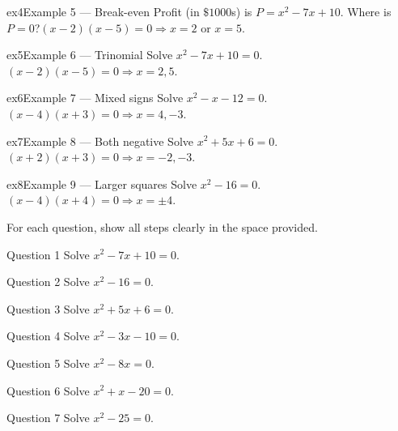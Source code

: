\documentclass[11pt]{article}
\begin{document}
\begin{example}{ex4}{Example 5 --- Break-even}
Profit (in $\$1000$s) is $P=x^2-7x+10$. Where is $P=0$?\soln $(x-2)(x-5)=0\Rightarrow x=2$ or $x=5$.
\end{example}

\begin{example}{ex5}{Example 6 --- Trinomial}
Solve $x^2-7x+10=0$.\soln $(x-2)(x-5)=0\Rightarrow x=2,5$.
\end{example}

\begin{example}{ex6}{Example 7 --- Mixed signs}
Solve $x^2-x-12=0$.\soln $(x-4)(x+3)=0\Rightarrow x=4,-3$.
\end{example}

\begin{example}{ex7}{Example 8 --- Both negative}
Solve $x^2+5x+6=0$.\soln $(x+2)(x+3)=0\Rightarrow x=-2,-3$.
\end{example}

\begin{example}{ex8}{Example 9 --- Larger squares}
Solve $x^2-16=0$.\soln $(x-4)(x+4)=0\Rightarrow x=\pm4$.
\end{example}

\clearpage
{}
For each question, show all steps clearly in the space provided.

\begin{qbox}{Question 1}
Solve $x^2-7x+10=0$.\workspace{2.4cm}
\end{qbox}

\begin{qbox}{Question 2}
Solve $x^2-16=0$.\workspace{2.4cm}
\end{qbox}

\begin{qbox}{Question 3}
Solve $x^2+5x+6=0$.\workspace{2.4cm}
\end{qbox}

\begin{qbox}{Question 4}
Solve $x^2-3x-10=0$.\workspace{2.4cm}
\end{qbox}

\begin{qbox}{Question 5}
Solve $x^2-8x=0$.\workspace{2.4cm}
\end{qbox}

\begin{qbox}{Question 6}
Solve $x^2+x-20=0$.\workspace{2.4cm}
\end{qbox}

\begin{qbox}{Question 7}
Solve $x^2-25=0$.\workspace{2.4cm}
\end{qbox}
\end{document}
